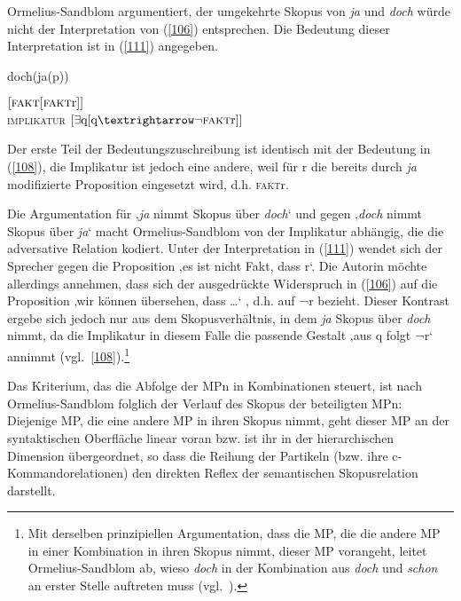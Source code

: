 Ormelius-Sandblom argumentiert, der umgekehrte Skopus von \textit{ja} und \textit{doch} würde nicht der Interpretation von (\ref{106}) entsprechen. Die Bedeutung dieser Interpretation ist in (\ref{111}) angegeben.

\begin{exe}
	\ex\label{110}														 
	doch(ja(p))
\end{exe}
\begin{exe}
	\ex\label{111}														 
	$[\textrm{\textsc{fakt}}[\textrm{\textsc{fakt}r}]]$\\
	\textsc{implikatur} $[\exists \textrm{q} [\textrm{q} → \neg \textrm{\textsc{fakt}r}]]$
	\hfill\hbox{\citet[93]{Ormelius-Sandblom1997}}
\end{exe}
Der erste Teil der Bedeutungszuschreibung ist identisch mit der Bedeutung in (\ref{108}), die Implikatur ist jedoch eine andere, weil für r die bereits durch \textit{ja} modifizierte Proposition eingesetzt wird, d.h. \textsc{fakt}r.

Die Argumentation für ‚\textit{ja} nimmt Skopus über \textit{doch}‘ und gegen ‚\textit{doch} nimmt Skopus über \textit{ja}‘ macht Ormelius-Sandblom von der Implikatur abhängig, die die adversative Relation kodiert. Unter der Interpretation in (\ref{111}) wendet sich der Sprecher gegen die Proposition ‚es ist nicht Fakt, dass r‘. Die Autorin möchte allerdings annehmen, dass sich der ausgedrückte Widerspruch in (\ref{106}) auf die Proposition ‚wir können übersehen, dass \ldots‘ , d.h. auf ¬r bezieht. Dieser Kontrast ergebe sich jedoch nur aus dem Skopusverhältnis, in dem \textit{ja} Skopus über \textit{doch} nimmt, da die Implikatur in diesem Falle die passende Gestalt ‚aus q folgt ¬r‘ annimmt (vgl.\ \ref{108}).\footnote{Mit derselben prinzipiellen Argumentation, dass die MP, die die andere MP in einer Kombination in ihren Skopus nimmt, dieser MP vorangeht, leitet Ormelius-Sandblom ab, wieso \textit{doch} in der Kombination aus \textit{doch} und \textit{schon} an erster Stelle auftreten muss (vgl.\ \citealt[93--94]{Ormelius-Sandblom1997}).}

Das Kriterium, das die Abfolge der MPn in Kombinationen steuert, ist nach Ormelius-Sandblom folglich der Verlauf des Skopus der beteiligten MPn: Diejenige MP, die eine andere MP in ihren Skopus nimmt, geht dieser MP an der syntakti\-schen Oberfläche linear voran bzw. ist ihr in der hierarchischen Dimension übergeordnet, so dass die Reihung der Partikeln (bzw. ihre c-Kommandorelationen)  den direkten Reflex der semantischen Skopusrelation darstellt.\\

